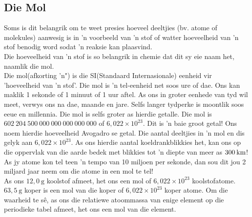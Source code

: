             \subsection*{Die Mol}
            \nopagebreak
Soms is dit belangrik om te weet presies hoeveel deeltjies (bv. atome of molekules) aanwesig is in  'n voorbeeld van  'n stof of watter hoeveelheid van  'n stof benodig word sodat   'n reaksie kan plaasvind.\\
Die hoeveelheid van   'n stof is so belangrik in chemie dat dit sy eie naam het, naamlik die mol.\\
 {Die mol(afkorting 'n") is die SI(Standaard Internasionale) eenheid vir 'hoeveelheid van  'n stof'. } 
Die mol is  'n tel-eenheid net soos ure of dae. Ons kan maklik 1 sekonde of 1 minuut of 1 uur aftel. As ons in groter eenhede van tyd wil meet, verwys ons na dae, maande en jare. Selfs langer tydperke is moontlik soos eeue en millennia. Die mol is selfs groter as hierdie getalle. Die mol is $602 ~204 ~500 ~000 ~000 ~000 ~000 ~000$ of $6,022 \times 10^{23}$. Dit is  'n baie groot getal! Ons noem hierdie hoeveelheid Avogadro se getal. 
 {Die aantal deeltjies in  'n mol en dis gelyk aan $6,022\ensuremath{\times}{10}^{23}$.} 
As ons hierdie aantal koeldrankblikkies het, kan ons op die oppervlak van die aarde bedek met blikkies tot  'n diepte van meer as $300\phantom{\rule{2pt}{0ex}}\text{km}$! As jy atome kon tel teen  'n tempo van 10 miljoen per sekonde, dan sou dit jou 2 miljard jaar neem om die atome in een mol te tel! \\
As ons $12,0 ~\text{g}$ koolstof afmeet, het ons een mol of $6,022 \times 10^{23}$ koolstofatome. $63,5 ~\text{g}$ koper is een mol van die koper of $6,022 \times 10^{23}$ koper atome. Om die waarheid te s\^{e}, as ons die relatiewe atoommassa van enige element op die periodieke tabel afmeet, het ons een mol van die element.

